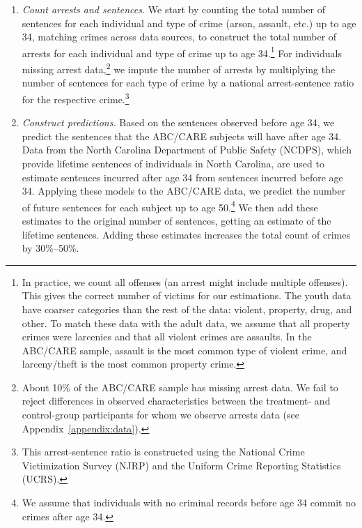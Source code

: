 \begin{enumerate}
\item \textit{Count arrests and sentences.} We start by counting the total number of sentences for each individual and type of crime (arson, assault, etc.) up to age 34, matching crimes across data sources, to construct the total number of  arrests for each individual and type of crime up to age 34.\footnote{In practice, we count all offenses (an arrest might include multiple offenses). This gives the correct number of victims for our estimations. The youth data have coarser categories than the rest of the data: violent, property, drug, and other. To match these data with the adult data, we assume that all property crimes were larcenies and that all violent crimes are assaults. In the ABC/CARE sample, assault is the most common type of violent crime, and larceny/theft is the most common property crime.} For individuals missing arrest data,\footnote{About 10\% of the ABC/CARE sample has missing arrest data. We fail to reject differences in observed characteristics between the treatment- and control-group participants for whom we observe arrests data (see Appendix~\ref{appendix:data}).} we impute the number of arrests by multiplying the number of sentences for each type of crime by a national arrest-sentence ratio for the respective crime.\footnote{This arrest-sentence ratio is constructed using the National Crime Victimization Survey (NJRP) and the Uniform Crime Reporting Statistics (UCRS).}

\item \textit{Construct predictions.} Based on the sentences observed before age 34, we predict the sentences that the ABC/CARE subjects will have after age 34. Data from the North Carolina Department of Public Safety (NCDPS), which provide lifetime sentences of individuals in North Carolina, are used to estimate sentences incurred after age 34 from sentences incurred before age 34. Applying these models to the ABC/CARE data, we predict the number of future sentences for each subject up to age 50.\footnote{We assume that individuals with no criminal records before age 34 commit no crimes after age 34.} We then add these estimates to the original number of sentences, getting an estimate of the lifetime sentences. Adding these estimates increases the total count of crimes by 30\%--50\%.


\end{enumerate}

